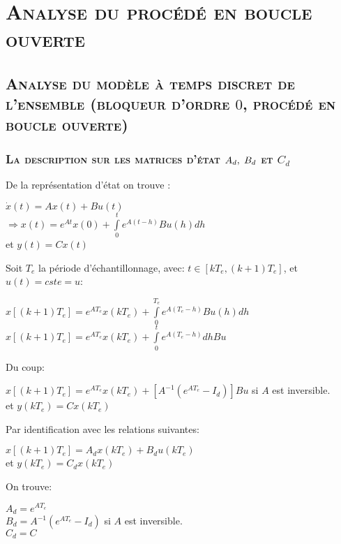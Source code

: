 \chapter{\textsc{Analyse du procédé en boucle ouverte}}
\section{\textsc{ Analyse du modèle à temps discret de l'ensemble (bloqueur d'ordre $0$, procédé en boucle ouverte) }}
\subsection{\textsc{La description sur les matrices d'état $ A_d,\hspace{1mm}B_d $ et $ C_d $ }}

De la représentation d'état on trouve :
	\begin{center}
		$ \dot{x}(t)=Ax(t)+Bu(t)$\\
 		$ \Longrightarrow  x(t) = e^{At} x(0) + \overset{t}{\underset{0}{ \int }} e^{ A(t-h)} Bu(h) dh $\\
 		et $y(t)=Cx(t) $
	\end{center}
Soit $T_e$ la période d'échantillonnage, avec: $t \in [kT_e,(k+1)T_e]$, et $u(t)=cste=u$:\\

	\begin{center}
		$ x[(k+1)T_e] = e^{AT_e} x(kT_e) + \overset{T_e}{\underset{0}{ \int }} e^{ A(T_e-h)} Bu(h) dh $\\
 		$ x[(k+1)T_e] = e^{AT_e} x(kT_e) +  \overset{t}{\underset{0}{ \int }} e^{ A(T_e-h)}dh Bu $ \\[0.5 cm]
 		\end{center}
 		
 		Du coup: \\
 		\begin{center}
 		$ x[(k+1)T_e] = e^{AT_e} x(kT_e) + [A^{-1}(e^{AT_e}-I_d)] Bu $ si $A$ est inversible.\\[0.25 cm]
 		et $y(kT_e)=Cx(kT_e)$
	\end{center}
Par identification avec les relations suivantes:\\ 
	\begin{center}
		$ x[(k+1)T_e] = A_d x(kT_e) + B_d u(kT_e) $\\
 		et $y(kT_e)=C_d x(kT_e)$\\
	\end{center}	
On trouve: 
	\begin{center}
		$ A_d = e^{AT_e} $\\
		$ B_d = A^{-1}(e^{AT_e}-I_d) $ si $A$ est inversible.\\  
 		$ C_d = C $
	\end{center}

	
	